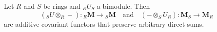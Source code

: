 Let $R$ and $S$ be rings and ${}_R U_S$ a bimodule. Then
$$({}_S U \otimes_R -): {}_R\mathbf{M} \to {}_S\mathbf{M} \quad \text{and} \quad (- \otimes_S U_R): \mathbf{M}_S \to \mathbf{M}_R$$
are additive covariant functors that preserve arbitrary direct sums.
